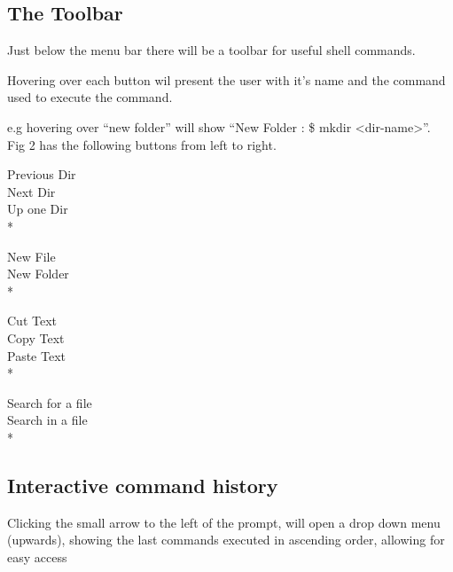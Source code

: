 \documentclass[a4paper,12pt]{article}
\begin{document}
\subsection*{The Toolbar}
Just below the menu bar there will be a toolbar for useful shell commands.

Hovering over each button wil present the user with it's name and the command used to execute the command.

e.g hovering over ``new folder'' will show ``New Folder : \$ mkdir \textless dir-name\textgreater''. \\

\noindent
Fig 2 has the following buttons from left to right.

\begin{multicols}{4}\noindent
  Previous Dir \\ %
  Next Dir \\ %
  Up one Dir \\*%
  \columnbreak

  \noindent
  New File \\ %
  New Folder \\*%
  \columnbreak

  \noindent
  Cut Text \\ %
  Copy Text \\ %
  Paste Text \\*%
  \columnbreak

  \noindent
  Search for a file \\ %
  Search in a file \\*%
\end{multicols}

\subsection*{Interactive command history}
Clicking the small arrow to the left of the prompt, will open a drop down menu (upwards), showing the last commands executed in ascending order, allowing for easy access
\end{document}
